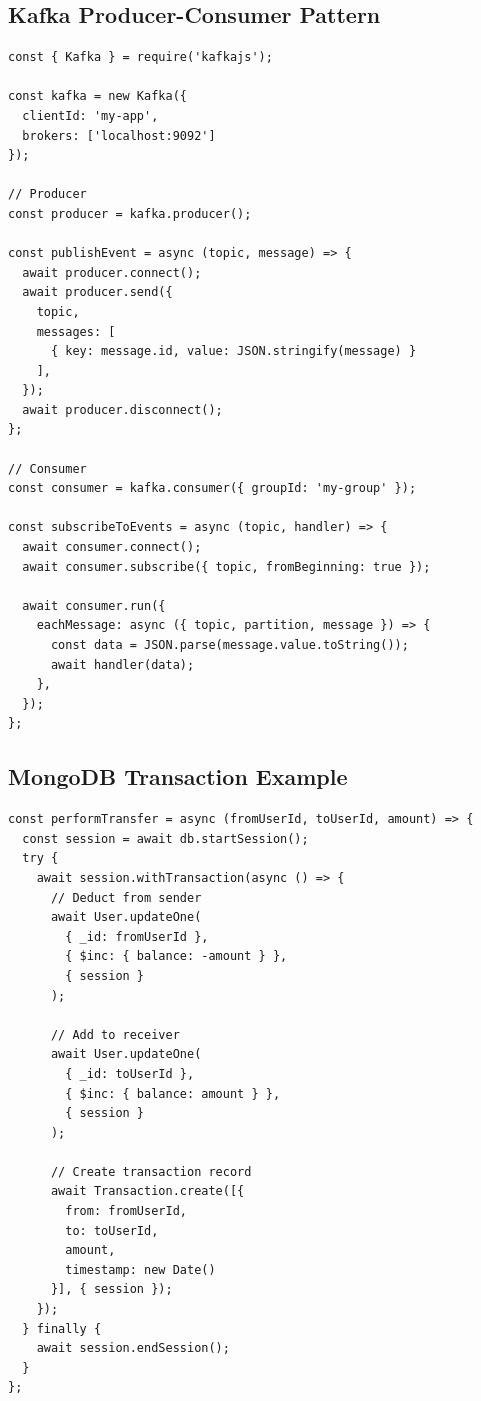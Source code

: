 \subsection{Kafka Producer-Consumer Pattern}

\begin{lstlisting}[basicstyle=\ttfamily\small, caption=Kafka Message Handling, captionpos=b]
const { Kafka } = require('kafkajs');

const kafka = new Kafka({
  clientId: 'my-app',
  brokers: ['localhost:9092']
});

// Producer
const producer = kafka.producer();

const publishEvent = async (topic, message) => {
  await producer.connect();
  await producer.send({
    topic,
    messages: [
      { key: message.id, value: JSON.stringify(message) }
    ],
  });
  await producer.disconnect();
};

// Consumer
const consumer = kafka.consumer({ groupId: 'my-group' });

const subscribeToEvents = async (topic, handler) => {
  await consumer.connect();
  await consumer.subscribe({ topic, fromBeginning: true });
  
  await consumer.run({
    eachMessage: async ({ topic, partition, message }) => {
      const data = JSON.parse(message.value.toString());
      await handler(data);
    },
  });
};
\end{lstlisting}

\subsection{MongoDB Transaction Example}

\begin{lstlisting}[basicstyle=\ttfamily\small, caption=ACID Transaction, captionpos=b]
const performTransfer = async (fromUserId, toUserId, amount) => {
  const session = await db.startSession();
  try {
    await session.withTransaction(async () => {
      // Deduct from sender
      await User.updateOne(
        { _id: fromUserId },
        { $inc: { balance: -amount } },
        { session }
      );
      
      // Add to receiver
      await User.updateOne(
        { _id: toUserId },
        { $inc: { balance: amount } },
        { session }
      );
      
      // Create transaction record
      await Transaction.create([{
        from: fromUserId,
        to: toUserId,
        amount,
        timestamp: new Date()
      }], { session });
    });
  } finally {
    await session.endSession();
  }
};
\end{lstlisting}

